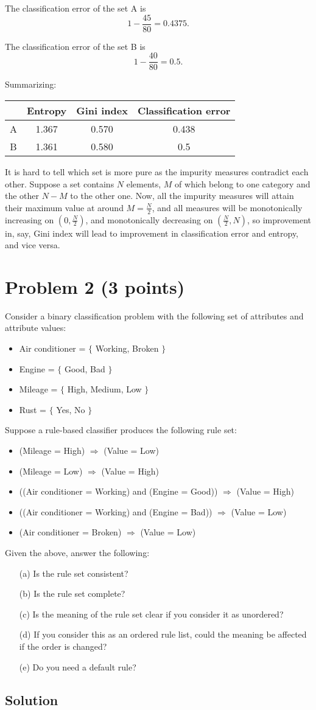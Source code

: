 \documentclass[10pt]{article}
\begin{document}
The classification error of the set A is
\[
1 - \frac{45}{80} = 0.4375.
\]

The classification error of the set B is
\[
1 - \frac{40}{80} = 0.5.
\]

Summarizing:
\begin{tabular}{|c||c|c|c|}
\hline
  & Entropy & Gini index & Classification error \\
\hline
A & 1.367 & 0.570 & 0.438 \\
B & 1.361 & 0.580 & 0.5 \\
\hline
\end{tabular}
It is hard to tell which set is more pure as the impurity measures contradict each other. Suppose a set contains $N$ elements, $M$ of which belong to one category and the other $N - M$ to the other one. Now, all the impurity measures will attain their maximum value at around $M = \frac{N}{2}$, and all measures will be monotonically increasing on $(0, \frac{N}{2})$, and monotonically decreasing on $(\frac{N}{2}, N)$, so improvement in, say, Gini index will lead to improvement in classification error and entropy, and vice versa.

\section*{Problem 2 (3 points)}
\color{blue}
Consider a binary classification problem with the following set of attributes and attribute values:
\begin{itemize}
\item Air conditioner = $\{$ Working, Broken $\}$
\item Engine = $\{$ Good, Bad $\}$
\item Mileage = $\{$ High, Medium, Low $\}$
\item Rust = $\{$ Yes, No $\}$
\end{itemize}
Suppose a rule-based classifier produces the following rule set:
\begin{itemize}
\item (Mileage = High) $\Rightarrow$ (Value = Low)
\item (Mileage = Low) $\Rightarrow$ (Value = High)
\item ((Air conditioner = Working) and (Engine = Good)) $\Rightarrow$ (Value = High)
\item ((Air conditioner = Working) and (Engine = Bad)) $\Rightarrow$ (Value = Low)
\item (Air conditioner = Broken) $\Rightarrow$ (Value = Low)
\end{itemize}
Given the above, answer the following:
\begin{itemize}
\item[(a)] Is the rule set consistent?
\item[(b)] Is the rule set complete?
\item[(c)] Is the meaning of the rule set clear if you consider it as unordered?
\item[(d)] If you consider this as an ordered rule list, could the meaning be affected if the order is changed?
\item[(e)] Do you need a default rule?
\end{itemize}
\color{black}

\subsection*{Solution}
\end{document}
